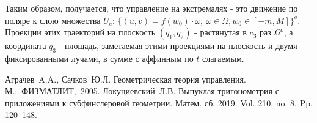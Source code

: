 Таким образом, получается, что управление на экстремалях - это движение по поляре к слою множества \(U_e\): \(\{(u, v) = f(w_0)\cdot\omega,\ \omega\in\Omega, w_0\in [-m, M]\}^o\). Проекции этих траекторий на плоскость \((q_1, q_2)\) - растянутая в \(c_3\) раз \(\Omega^o\), а координата \(q_3\) - площадь, заметаемая этими проекциями на плоскость и двумя фиксированными лучами, в сумме с аффинным по \(t\) слагаемым.


%

%

\begin{thebibliography}{9} %
 Аграчев~A.A., Сачков~Ю.Л. Геометрическая теория управления. М.:~ФИЗМАТЛИТ,~2005. 
 Локуциевский~Л.В. Выпуклая тригонометрия с приложениями к субфинслеровой геометрии. Матем. сб. 2019. Vol. 210, no. 8. Pp. 120--148.
\end{thebibliography}




%


